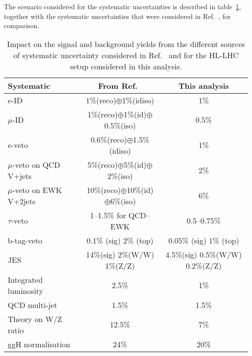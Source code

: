 \documentclass[../report.tex]{subfiles}
\begin{document}
The scenario considered for the systematic uncertainties is described
in table~\ref{tab:systs}, together with the systematic uncertainties that were 
considered in Ref.~\cite{Sirunyan:2018owy}, for comparison.

\begin{table}[ht]
  \centering
  {%
  \begin{tabular}{l|c|c}
    \hline
    Systematic & From Ref.~\cite{Sirunyan:2018owy} & This analysis \\
    \hline
    e-ID & 1\%(reco)$\oplus$1\%(idiso) & 1\% \\
    $\mu$-ID & 1\%(reco)$\oplus$1\%(id)$\oplus$0.5\%(iso) & 0.5\% \\
    \hline
    e-veto & 0.6\%(reco)$\oplus$1.5\%(idiso) & 1\% \\
    $\mu$-veto on QCD V+jets & 5\%(reco)$\oplus$5\%(id)$\oplus$2\%(iso) & 2\% \\
    $\mu$-veto on EWK V+2jets & 10\%(reco)$\oplus$10\%(id)$\oplus$6\%(iso) & 6\% \\
    $\tau$-veto & 1--1.5\% for QCD--EWK  & 0.5--0.75\% \\
    b-tag-veto & 0.1\% (sig) 2\% (top) & 0.05\% (sig) 1\% (top) \\
    \hline
    JES & 14\%(sig) 2\%(W/W) 1\%(Z/Z) & 4.5\%(sig) 0.5\%(W/W) 0.2\%(Z/Z) \\
    Integrated luminosity & 2.5\% & 1\% \\
    QCD multi-jet & 1.5\%  & 1.5\% \\
    \hline
    Theory on W/Z ratio & 12.5\% & 7\% \\
    ggH normalisation & 24\% & 20\% \\
    \hline
\end{tabular}
    } \caption{Impact on the signal and background yields from the
    different sources of systematic uncertainty considered in
    Ref.~\cite{Sirunyan:2018owy} and for the HL-LHC setup considered
    in this analysis.}  \label{tab:systs}
\end{table}
\end{document}
